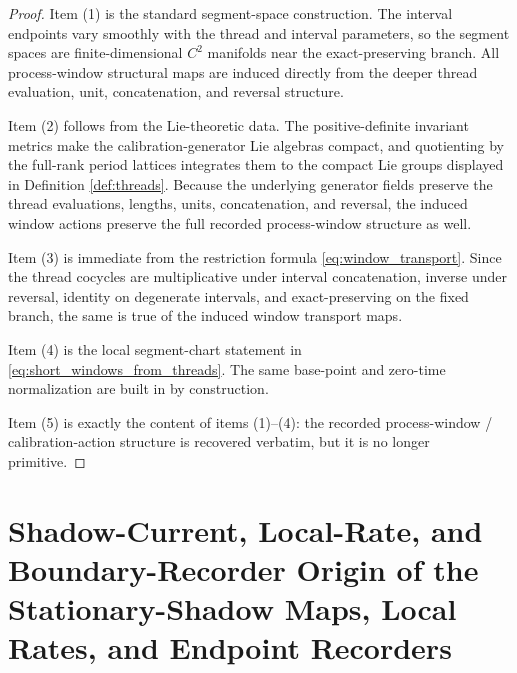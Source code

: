 \documentclass[11pt]{article}
\begin{document}
\begin{proof}
Item (1) is the standard segment-space construction. The interval endpoints vary smoothly with the thread and interval parameters, so the segment spaces are finite-dimensional \(C^2\) manifolds near the exact-preserving branch. All process-window structural maps are induced directly from the deeper thread evaluation, unit, concatenation, and reversal structure.

Item (2) follows from the Lie-theoretic data. The positive-definite invariant metrics make the calibration-generator Lie algebras compact, and quotienting by the full-rank period lattices integrates them to the compact Lie groups displayed in Definition \ref{def:threads}. Because the underlying generator fields preserve the thread evaluations, lengths, units, concatenation, and reversal, the induced window actions preserve the full recorded process-window structure as well.

Item (3) is immediate from the restriction formula \eqref{eq:window_transport}. Since the thread cocycles are multiplicative under interval concatenation, inverse under reversal, identity on degenerate intervals, and exact-preserving on the fixed branch, the same is true of the induced window transport maps.

Item (4) is the local segment-chart statement in \eqref{eq:short_windows_from_threads}. The same base-point and zero-time normalization are built in by construction.

Item (5) is exactly the content of items (1)--(4): the recorded process-window / calibration-action structure is recovered verbatim, but it is no longer primitive.
\end{proof}

\section{Shadow-Current, Local-Rate, and Boundary-Recorder Origin of the Stationary-Shadow Maps, Local Rates, and Endpoint Recorders}
\end{document}
